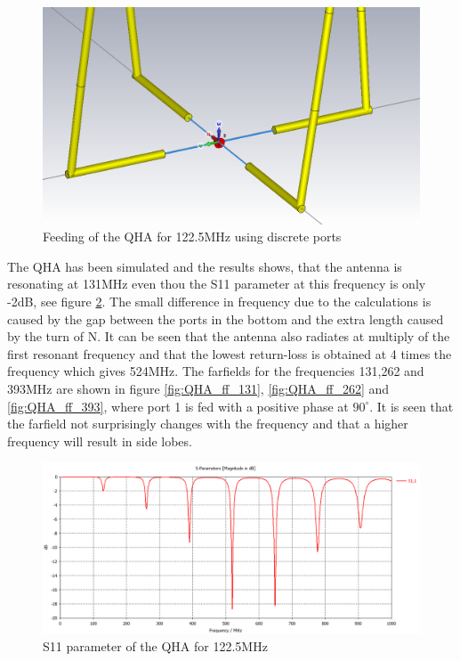 \begin{figure}[H]
\centering 
\includegraphics[scale = 0.4]{figures/antennas/qha/qha_6_feeding}
\caption{Feeding of the QHA for 122.5MHz using discrete ports}
\label{fig:QHA2}
\end{figure}
 
The QHA has been simulated and the results shows, that the antenna is resonating at 131MHz even thou the S11 parameter at this frequency is only -2dB, see figure \ref{fig:QHA_S11}. The small difference in frequency due to the calculations is caused by the gap between the ports in the bottom and the extra length caused by the turn of N. It can be seen that the antenna also radiates at multiply of the first resonant frequency and that the lowest return-loss is obtained at 4 times the frequency which gives 524MHz. The farfields for the frequencies 131,262 and 393MHz are shown in figure \ref{fig:QHA_ff_131}, \ref{fig:QHA_ff_262} and \ref{fig:QHA_ff_393}, where port 1 is fed with a positive phase at $90^\circ$. It is seen that the farfield not surprisingly changes with the frequency and that a higher frequency will result in side lobes.        

\begin{figure}[H]
\centering 
\includegraphics[scale = 0.4]{figures/antennas/qha/qha_6_S11}
\caption{S11 parameter of the QHA for 122.5MHz}
\label{fig:QHA_S11}
\end{figure}

